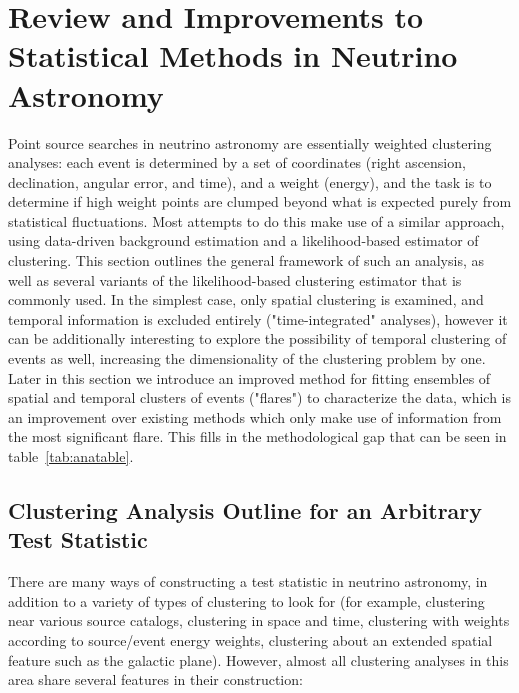 \chapter{Review and Improvements to Statistical Methods in Neutrino Astronomy}\label{chapter:methods}
Point source searches in neutrino astronomy are essentially weighted clustering analyses: each event is determined by a set of coordinates (right ascension, declination, angular error, and time), and a weight (energy), and the task is to determine if high weight points are clumped beyond what is expected purely from statistical fluctuations. Most attempts to do this make use of a similar approach, using data-driven background estimation and a likelihood-based estimator of clustering. This section outlines the general framework of such an analysis, as well as several variants of the likelihood-based clustering estimator that is commonly used. In the simplest case, only spatial clustering is examined, and temporal information is excluded entirely ("time-integrated" analyses), however it can be additionally interesting to explore the possibility of temporal clustering of events as well, increasing the dimensionality of the clustering problem by one. Later in this section we introduce an improved method for fitting ensembles of spatial and temporal clusters of events ("flares") to characterize the data, which is an improvement over existing methods which only make use of information from the most significant flare. This fills in the methodological gap that can be seen in table~\ref{tab:anatable}. 

\section{Clustering Analysis Outline for an Arbitrary Test Statistic}
There are many ways of constructing a test statistic in neutrino astronomy, in addition to a variety of types of clustering to look for (for example, clustering near various source catalogs, clustering in space and time, clustering with weights according to source/event energy weights, clustering about an extended spatial feature such as the galactic plane). However, almost all clustering analyses in this area share several features in their construction:

